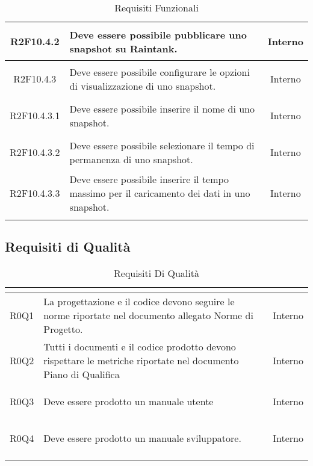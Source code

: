\begin{longtable}{|c|H|c|}
	\hypertarget{R2F10.4.2}{R2F10.4.2} & Deve essere possibile pubblicare uno snapshot su Raintank. & Interno \\ \hline 
	\hypertarget{R2F10.4.3}{R2F10.4.3} & Deve essere possibile configurare le opzioni di visualizzazione di uno snapshot. & Interno \\ \hline 
	\hypertarget{R2F10.4.3.1}{R2F10.4.3.1} & Deve essere possibile inserire il nome di uno snapshot. & Interno \\ \hline 
	\hypertarget{R2F10.4.3.2}{R2F10.4.3.2} & Deve essere possibile selezionare il tempo di permanenza di uno snapshot. & Interno \\ \hline 
	\hypertarget{R2F10.4.3.3}{R2F10.4.3.3} & Deve essere possibile inserire il tempo massimo per il caricamento dei dati in uno snapshot. & Interno \\ \hline 
	
	\caption[Requisiti Funzionali]{Requisiti Funzionali}
	\label{tabella:req0}
\end{longtable}
\renewcommand{\arraystretch}{1}
\clearpage
{}
\subsection{Requisiti di Qualità}
\normalsize
\renewcommand{\arraystretch}{1.5}
\begin{longtable}{|c|H|c|}
	\hline
	\textbf{\color{title_text}{Id Requisito}} & \textbf{\color{title_text}{Descrizione}} & \textbf{\color{title_text}{Fonte}}\\
	\hline
	\endhead
	\hypertarget{R0Q1}{R0Q1} & La progettazione e il codice devono seguire le norme riportate nel documento allegato Norme di Progetto. & Interno \\ \hline 
	\hypertarget{R0Q2}{R0Q2} & Tutti i documenti e il codice prodotto devono rispettare le metriche riportate nel documento Piano di Qualifica & Interno \\ \hline 
	\hypertarget{R0Q3}{R0Q3} & Deve essere prodotto un manuale utente & Interno \\ \hline 
	\hypertarget{R0Q4}{R0Q4} & Deve essere prodotto un manuale sviluppatore. & Interno \\ \hline 
	\caption[Requisiti di Qualità]{Requisiti Di Qualità}
	\label{tabella:req1}
\end{longtable}
\renewcommand{\arraystretch}{1}
\clearpage
{}
